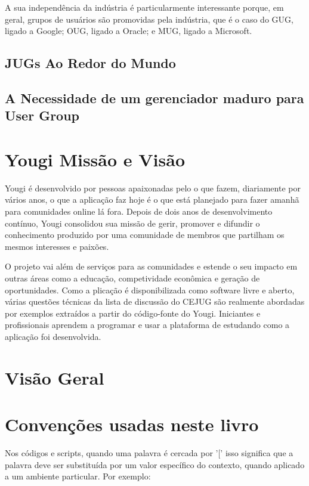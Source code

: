 \documentclass[envcountsame,envcountchap]{svmono}
\begin{document}
A sua independência da indústria é particularmente interessante porque, em geral, grupos de usuários são promovidas pela indústria, que é o caso do GUG, ligado a Google; OUG, ligado a Oracle; e MUG, ligado a Microsoft.

\subsection{JUGs Ao Redor do Mundo}

\subsection{A Necessidade de um gerenciador maduro para User Group}

\section{Yougi Missão e Visão}

Yougi é desenvolvido por pessoas apaixonadas pelo o que fazem, diariamente por vários anos, o que a aplicação faz hoje é o que está planejado para fazer amanhã para comunidades online lá fora. Depois de dois anos de desenvolvimento contínuo, Yougi consolidou sua missão de gerir, promover e difundir o conhecimento produzido por uma comunidade de membros que partilham os mesmos interesses e paixões.

O projeto vai além de serviços para as comunidades e estende o seu impacto em outras áreas como a educação, competividade econômica e geração de oportunidades. Como a plicação é disponibilizada como software livre e aberto, várias questões técnicas da lista de discussão do CEJUG são realmente abordadas por exemplos extraídos a partir do código-fonte do Yougi. Iniciantes e profissionais aprendem a programar e usar a plataforma de estudando como a aplicação foi desenvolvida.

\section{Visão Geral}

\section{Convenções usadas neste livro}

Nos códigos e scripts, quando uma palavra é cercada por '[' isso significa que a palavra deve ser substituída por um valor específico do contexto, quando aplicado a um ambiente particular. Por exemplo:
\end{document}
